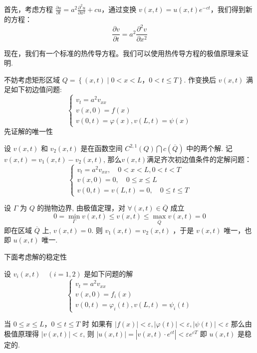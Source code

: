 \begin{questions}

\begin{solution}
    首先，考虑方程 $ \frac{\partial u}{\partial t} = a^{2} \frac{\partial^{2} u}{\partial x^{2}} + cu $，通过变换 $ v(x, t) = u(x, t)e^{-ct} $，我们得到新的方程：
$$
\frac{\partial v}{\partial t} = a^{2} \frac{\partial^{2} v}{\partial x^{2}}
$$

现在，我们有一个标准的热传导方程。我们可以使用热传导方程的极值原理来证明.

不妨考虑矩形区域 
$Q=\left\{(x, t) \mid 0< x < L ， 0 < t \leqslant T\right\}$. 作变换后 $v(x, t)$ 满足如下初边值问题: 
$$\left\{\begin{array}{l}v_{t}=a^{2} v_{x x} \\ v(x, 0)=f(x) \\ v(0, t)=\varphi(x), v(L, t)=\psi(x)\end{array}\right.$$
先证解的唯一性

设 $ v(x, t) $ 和 $ v_{2}(x, t) $ 是在函数空间 $ C^{2,1}(Q) \bigcap c(\overline{Q}) $ 中的两个解. 记 $ v(x, t)=v_{1}(x, t)-v_{2}(x, t) $, 那么$ v(x, t) $满足齐次初边值条件的定解问题：
$$\left\{\begin{array}{ll}
v_{t}=a^{2} v_{x x} ,\quad 0 < x < L, 0 < t < T \\
v(x, 0)=0 ,\quad 0 \leqslant x \leqslant L \\
v(0, t)=v(L, t)=0, \quad 0 \leqslant t \leqslant T
\end{array}\right.
$$

设 $\Gamma$ 为 $Q$ 的抛物边界, 由极值定理，对 $\forall(x, t) \in \overline{Q}$
成立 
$$0=\min _{\Gamma} v(x, t) \leqslant v(x, t) \leqslant \max_{ \overline Q} v(x, t)=0$$
即在区域 $\overline Q$ 上, $ v(x, t)=0 $.
则 $v_{1}(x, t)=v_{2}(x, t) $ ，于是 $ v(x, t) $ 唯一，也即 $ u(x, t) $ 唯一.

下面考虑解的稳定性

设 $ v_{i}(x, t) \quad(i=1,2) $ 是如下问题的解
$$ \left\{\begin{array}{l}v_{t}=a^{2} v_{x x} \\ v(x, 0)=f_{i}(x) \\ v(0, t)=\varphi_{i}(t), v(L, t)=\psi_{i}(t)\end{array}\right. $$

当 $ 0 \leqslant x \leqslant L ， 0 \leqslant t \leqslant T $ 时
如果有 $|f(x)| < \varepsilon,|\varphi(t)| < \varepsilon,|\psi(t)| < \varepsilon$
那么由极值原理得 $ |v(x, t)|<\varepsilon $,
则 $|u(x, t)|=\left|v(x, t) \cdot e^{c t}\right|<\varepsilon e^{c T}$
即 $u(x, t)$ 是稳定的.


\end{solution}
\end{questions}

